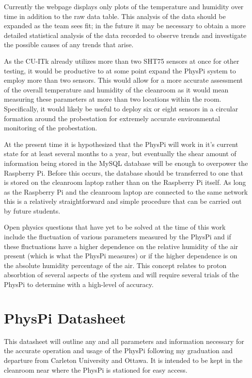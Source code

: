 \documentclass[letterpaper, 11pt]{report}
\begin{document}
Currently the webpage displays only plots of the temperature and humidity over time in addition to the raw data table.  This analysis of the data should be expanded as the team sees fit; in the future it may be necessary to obtain a more detailed statistical analysis of the data recorded to observe trends and investigate the possible causes of any trends that arise.

As the CU-ITk already utilizes more than two SHT75 sensors at once for other testing, it would be productive to at some point expand the PhysPi system to employ more than two sensors.  This would allow for a more accurate assessment of the overall temperature and humidity of the cleanroom as it would mean measuring these parameters at more than two locations within the room.  Specifically, it would likely be useful to deploy six or eight sensors in a circular formation around the probestation for extremely accurate environmental monitoring of the probestation.  

At the present time it is hypothesized that the PhysPi will work in it's current state for at least several months to a year, but eventually the shear amount of information being stored in the MySQL database will be enough to overpower the Raspberry Pi.  Before this occurs, the database should be transferred to one that is stored on the cleanroom laptop rather than on the Raspberry Pi itself.  As long as the Raspberry Pi and the cleanroom laptop are connected to the same network this is a relatively straightforward and simple procedure that can be carried out by future students.

Open physics questions that have yet to be solved at the time of this work include the fluctuation of various parameters measured by the PhysPi and if these fluctuations have a higher dependence on the relative humidity of the air present (which is what the PhysPi measures) or if the higher dependence is on the absolute humidity percentage of the air.  This concept relates to proton absorbtion of several aspects of the system and will require several trials of the PhysPi to determine with a high-level of accuracy.

\appendix
\chapter{PhysPi Datasheet} 

This datasheet will outline any and all parameters and information necessary for the accurate operation and usage of the PhysPi following my graduation and departure from Carleton University and Ottawa.  It is intended to be kept in the cleanroom near where the PhysPi is stationed for easy access.
\end{document}
